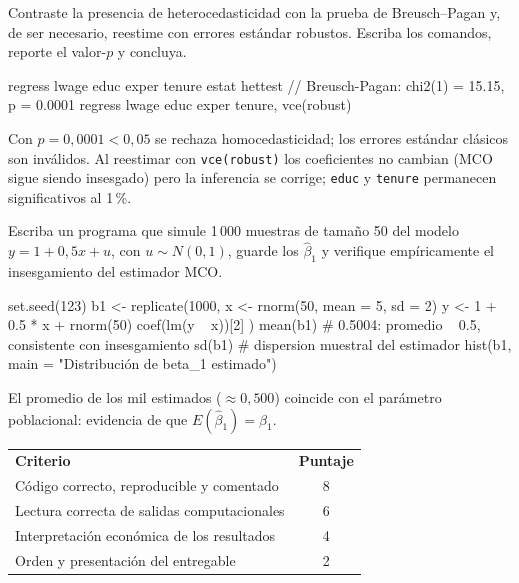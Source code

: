 \documentclass{evaluacion}
\begin{document}
\begin{ejercicio}[6][Diagnóstico]
Contraste la presencia de heterocedasticidad con la prueba de
Breusch--Pagan y, de ser necesario, reestime con errores estándar
robustos. Escriba los comandos, reporte el valor-$p$ y concluya.

\recuadrorespuesta{5cm}
\begin{solucion}
\begin{codigo}[language=Stata]
regress lwage educ exper tenure
estat hettest            // Breusch-Pagan: chi2(1) = 15.15, p = 0.0001
regress lwage educ exper tenure, vce(robust)
\end{codigo}
Con $p = 0{,}0001 < 0{,}05$ se rechaza homocedasticidad; los errores
estándar clásicos son inválidos. Al reestimar con \texttt{vce(robust)}
los coeficientes no cambian (MCO sigue siendo insesgado) pero la
inferencia se corrige; \texttt{educ} y \texttt{tenure} permanecen
significativos al 1\,\%.
\end{solucion}
\end{ejercicio}

\begin{ejercicio}[4][Simulación]
Escriba un programa que simule 1\,000 muestras de tamaño 50 del modelo
$y = 1 + 0{,}5x + u$, con $u\sim N(0,1)$, guarde los $\hat\beta_1$ y
verifique empíricamente el insesgamiento del estimador MCO.

\recuadrorespuesta{5cm}
\begin{solucion}
\begin{codigo}[language=R]
set.seed(123)
b1 <- replicate(1000, {
  x <- rnorm(50, mean = 5, sd = 2)
  y <- 1 + 0.5 * x + rnorm(50)
  coef(lm(y ~ x))[2]
})
mean(b1)   # 0.5004: promedio ~ 0.5, consistente con insesgamiento
sd(b1)     # dispersion muestral del estimador
hist(b1, main = "Distribución de beta_1 estimado")
\end{codigo}
El promedio de los mil estimados ($\approx 0{,}500$) coincide con el
parámetro poblacional: evidencia de que $E(\hat\beta_1)=\beta_1$.
\end{solucion}
\end{ejercicio}

\begin{criterios}
\begin{tabularx}{\linewidth}{@{}X c@{}}
  \textbf{Criterio} & \textbf{Puntaje}\\
  \arrayrulecolor{grislinea}\hline\addlinespace[3pt]
  Código correcto, reproducible y comentado        & 8\\
  Lectura correcta de salidas computacionales      & 6\\
  Interpretación económica de los resultados       & 4\\
  Orden y presentación del entregable              & 2\\
\end{tabularx}
\end{criterios}

\findelexamen
\end{document}
